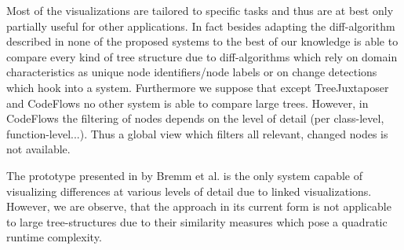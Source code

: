 Most of the visualizations are tailored to specific tasks and thus are at best only partially useful for other applications. In fact besides adapting the diff-algorithm described in \cite{telea2008code} none of the proposed systems to the best of our knowledge is able to compare every kind of tree structure due to diff-algorithms which rely on domain characteristics as unique node identifiers/node labels or on change detections which hook into a system. Furthermore we suppose that except TreeJuxtaposer and CodeFlows no other system is able to compare large trees. However, in CodeFlows the filtering of nodes depends on the level of detail (per class-level, function-level...). Thus a global view which filters all relevant, changed nodes is not available.

The prototype presented in \cite{bremm2011interactive} by Bremm et al. is the only system capable of visualizing differences at various levels of detail due to linked visualizations. However, we are observe, that the approach in its current form is not applicable to large tree-structures due to their similarity measures which pose a quadratic runtime complexity.














